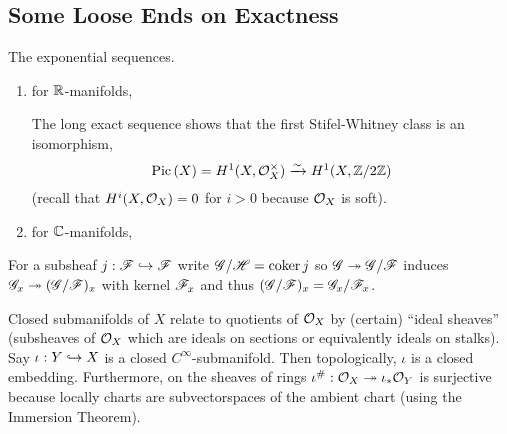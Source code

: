 \documentclass[12pt]{article}
\begin{document}
\subsection{Some Loose Ends on Exactness}

\begin{example}
The exponential sequences.
\begin{enumerate}
\item for $\mathbb{R}$-manifolds,
\begin{center}
\end{center}
The long exact sequence shows that the first Stifel-Whitney class is an isomorphism,
\[ \mathrm{Pic} \left( X \right) = H^1(X, \mathcal{O}_{X}^\times) \xrightarrow{\sim} H^1(X, \mathbb{Z} / 2 \mathbb{Z}) \]
(recall that $H^i(X, \mathcal{O}_{X}) = 0$ for $i > 0$ because $\mathcal{O}_{X}$ is soft). 
\item for $\mathbb{C}$-manifolds,
\begin{center}
\end{center}
\end{enumerate}
\end{example}

\begin{example}
For a subsheaf $j : \mathscr{F} \hookrightarrow \mathscr{F}$ write $\mathscr{G}/\mathscr{H} = \operatorname{\mathrm{coker}}{j}$ so $\mathscr{G} \twoheadrightarrow \mathscr{G}/\mathscr{F}$ induces $\mathscr{G}_x \twoheadrightarrow (\mathscr{G} / \mathscr{F})_x$ with kernel $\mathscr{F}_x$ and thus $(\mathscr{G} / \mathscr{F})_x = \mathscr{G}_x / \mathscr{F}_x$.
\end{example}

\begin{example}
Closed submanifolds of $X$ relate to quotients of $\mathcal{O}_{X}$ by (certain) ``ideal sheaves'' (subsheaves of $\mathcal{O}_{X}$ which are ideals on sections or equivalently ideals on stalks). 
\bigskip\\
Say $\iota : Y \hookrightarrow X$ is a closed $C^\infty$-submanifold. Then topologically, $\iota$ is a closed embedding. Furthermore, on the sheaves of rings $\iota^\# : \mathcal{O}_{X} \twoheadrightarrow \iota_* \mathcal{O}_{Y}$ is surjective because locally charts are subvectorspaces of the ambient chart (using the Immersion Theorem). 
\end{example}
\end{document}
